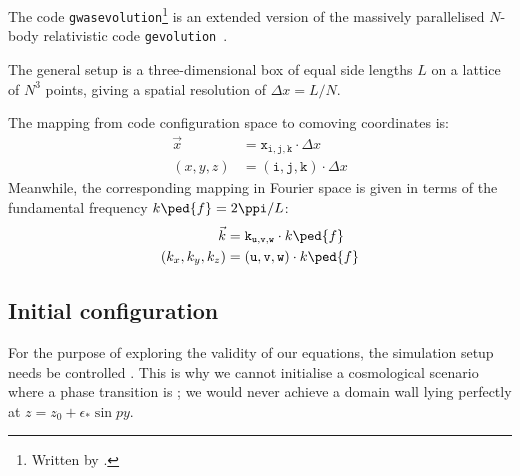 


\newcommand{\lcoord}[1]{\mathtt{#1}} %





The code \texttt{gwasevolution}\footnote{Written by \citeauthor{christiansenAsevolutionRelativisticNbody2023}.} is an extended version of the massively parallelised $N$-body relativistic code \texttt{gevolution}~\citep{adamekGevolutionCosmologicalNbody2016}. 


The general setup is a three-dimensional box of equal side lengths $L$ on a lattice of $N^3$ points, giving a spatial resolution of $\Delta x=L/N$. %

The mapping from code configuration space to comoving coordinates is:
\begin{equation}
    \begin{split}
        \vec{x} & = \lcoord{x}_{\lcoord{i}, \lcoord{j}, \lcoord{k}} \cdot \Delta x \\
        (x, y, z)&= (\lcoord{i}, \lcoord{j}, \lcoord{k})\cdot \Delta x
    \end{split}
\end{equation}
Meanwhile, the corresponding mapping in Fourier space is given in terms of the fundamental frequency $k\ped{f}=2\ppi/L$:
\begin{equation}
    \begin{split}
        \vec{k} & = \lcoord{k}_{\lcoord{u}, \lcoord{v}, \lcoord{w}} \cdot k\ped{f}\\
        (k_x, k_y, k_z)&=   (\lcoord{u}, \lcoord{v}, \lcoord{w})\cdot k\ped{f}
    \end{split}
\end{equation}



\subsection{Initial configuration}
    For the purpose of exploring the validity of our equations, the simulation setup needs be controlled . This is why we cannot initialise a cosmological scenario where a phase transition is ; we would never achieve a domain wall lying perfectly at $z=z_0+\epsilon_\ast \sin{py}$. 

